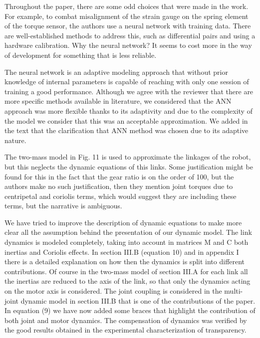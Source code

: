 \begin{point}
Throughout the paper, there are some odd choices that were made in the
work. For example, to combat misalignment of the strain gauge on the
spring element of the torque sensor, the authors use a neural network
with training data. There are well-established methods to address this,
such as differential pairs and using a hardware calibration. Why the
neural network? It seems to cost more in the way of development for
something that is less reliable.
\end{point}

\begin{reply}

The neural network is an adaptive modeling approach that without prior knowledge of internal parameters is capable of reaching with only one session of training a good performance. Although we agree with the reviewer that there are more specific methods available in literature, we considered that the ANN approach was more flexible thanks to its adaptivity and due to the complexity of the model we consider that this was an acceptable approximation.  
We added in the text that the clarification that  ANN method was chosen due to its adaptive nature.
\end{reply}



\begin{point}



 The two-mass model in Fig. 11 is used
to approximate the linkages of the robot, but this neglects the dynamic
equations of this links. Some justification might be found for this in
the fact that the gear ratio is on the order of 100, but the authors
make no such justification, then they mention joint torques due to
centripetal and coriolis terms, which would suggest they are including
these terms, but the narrative is ambiguous.
\end{point}



\begin{reply}
We have tried to improve the description of dynamic equations to make more clear all the assumption behind the presentation of our dynamic model.
The link dynamics is modeled completely, taking into account in matrices M and C both inertias and Coriolis effects. In section III.B (equation 10) and in appendix I there is a detailed explanation on how then the dynamics is split into different contributions.
 Of course in the two-mass model of section III.A for each link all the inertias are reduced to the axis of the link, so that only the dynamics acting on the motor axis is considered. 
 The joint coupling is considered in the multi-joint dynamic model in section III.B that is one of the contributions of the paper.
 In equation (9) we have now added some braces that highlight the contribution of both joint and motor dynamics. The compensation of dynamics was verified by the good results obtained in the experimental characterization of transparency.
\end{reply}




